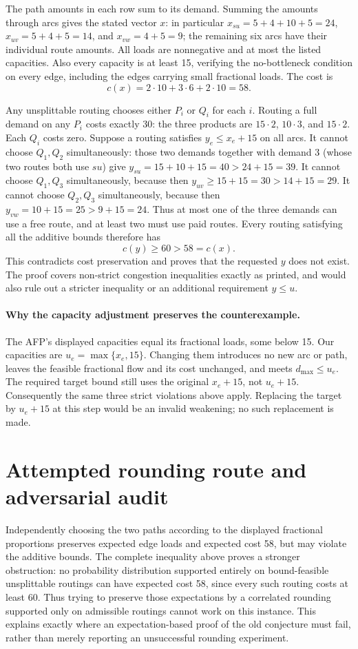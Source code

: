 \documentclass[11pt]{article}
\begin{document}
The path amounts in each row sum to its demand. Summing the amounts through
arcs gives the stated vector $x$: in particular $x_{su}=5+4+10+5=24$,
$x_{uv}=5+4+5=14$, and $x_{vw}=4+5=9$; the remaining six arcs have their
individual route amounts. All loads are nonnegative and at most the listed
capacities. Also every capacity is at least 15, verifying the no-bottleneck
condition on every edge, including the edges carrying small fractional loads.
The cost is
\[
c(x)=2\cdot10+3\cdot6+2\cdot10=58.
\]

Any unsplittable routing chooses either $P_i$ or $Q_i$ for each $i$.
Routing a full demand on any $P_i$ costs exactly 30: the three products are
$15\cdot2$, $10\cdot3$, and $15\cdot2$. Each $Q_i$ costs zero.
Suppose a routing satisfies $y_e\le x_e+15$ on all arcs.
It cannot choose $Q_1,Q_2$ simultaneously: those two demands together
with demand 3 (whose two routes both use $su$) give
$y_{su}=15+10+15=40>24+15=39$.
It cannot choose $Q_1,Q_3$ simultaneously, because then
$y_{uv}\ge15+15=30>14+15=29$.
It cannot choose $Q_2,Q_3$ simultaneously, because then
$y_{vw}=10+15=25>9+15=24$.
Thus at most one of the three demands can use a free route, and at least
two must use paid routes. Every routing satisfying all the additive bounds
therefore has
\[
c(y)\ge60>58=c(x).
\]
This contradicts cost preservation and proves that the requested $y$ does
not exist. The proof covers non-strict congestion inequalities exactly as
printed, and would also rule out a stricter inequality or an additional
requirement $y\le u$.

\paragraph{Why the capacity adjustment preserves the counterexample.}
The AFP's displayed capacities equal its fractional loads, some below 15.
Our capacities are $u_e=\max\{x_e,15\}$. Changing them introduces no new
arc or path, leaves the feasible fractional flow and its cost unchanged,
and meets $d_{\max}\le u_e$. The required target bound still uses the
original $x_e+15$, not $u_e+15$. Consequently the same three strict
violations above apply. Replacing the target by $u_e+15$ at this step
would be an invalid weakening; no such replacement is made.

\section{Attempted rounding route and adversarial audit}
Independently choosing the two paths according to the displayed fractional
proportions preserves expected edge loads and expected cost 58, but may
violate the additive bounds. The complete inequality above proves a stronger
obstruction: no probability distribution supported entirely on bound-feasible
unsplittable routings can have expected cost 58, since every such routing
costs at least 60. Thus trying to preserve those expectations by a correlated
rounding supported only on admissible routings cannot work on this instance.
This explains exactly where an expectation-based proof of the old conjecture
must fail, rather than merely reporting an unsuccessful rounding experiment.
\end{document}
